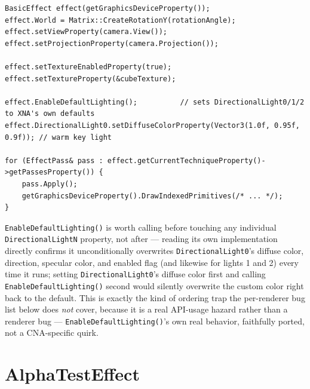 \begin{lstlisting}
BasicEffect effect(getGraphicsDeviceProperty());
effect.World = Matrix::CreateRotationY(rotationAngle);
effect.setViewProperty(camera.View());
effect.setProjectionProperty(camera.Projection());

effect.setTextureEnabledProperty(true);
effect.setTextureProperty(&cubeTexture);

effect.EnableDefaultLighting();          // sets DirectionalLight0/1/2 to XNA's own defaults
effect.DirectionalLight0.setDiffuseColorProperty(Vector3(1.0f, 0.95f, 0.9f)); // warm key light

for (EffectPass& pass : effect.getCurrentTechniqueProperty()->getPassesProperty()) {
    pass.Apply();
    getGraphicsDeviceProperty().DrawIndexedPrimitives(/* ... */);
}
\end{lstlisting}

\texttt{EnableDefaultLighting()} is worth calling before touching any individual
\texttt{DirectionalLightN} property, not after --- reading its own implementation directly
confirms it unconditionally overwrites \texttt{DirectionalLight0}'s diffuse color, direction,
specular color, and enabled flag (and likewise for lights 1 and 2) every time it runs; setting
\texttt{DirectionalLight0}'s diffuse color first and calling \texttt{EnableDefaultLighting()}
second would silently overwrite the custom color right back to the default. This is exactly the kind of ordering trap the per-renderer bug list below
does \emph{not} cover, because it is a real API-usage hazard rather than a renderer bug ---
\texttt{EnableDefaultLighting()}'s own real behavior, faithfully ported, not a CNA-specific
quirk.

\section{AlphaTestEffect}

